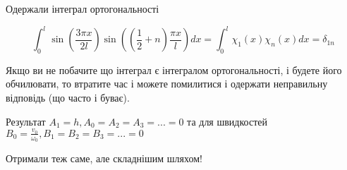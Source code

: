 \documentclass[a4paper, 14pt]{extreport}
\begin{document}
Одержали інтеграл ортогональності 

\begin{equation}
    \int^{l}_0 \sin \left( \frac{3 \pi x}{2 l} \right) \sin \left( (\frac{1}{2} + n) \frac{\pi x}{l} \right) dx = \int^{l}_0 \chi_1 (x) \chi_n (x) dx = \delta_{1n}
\end{equation}

Якщо ви не побачите що інтеграл є інтегралом ортогональності, і будете його обчилювати, то втратите час і можете помилитися і одержати неправильну відповідь (що часто і буває).

Результат $A_1 = h, A_0 = A_2 = A_3 = ... = 0$ та для швидкостей $B_0 = \frac{v_0}{\omega_0}, B_1 = B_2 = B_3 = ... = 0$

Отримали теж саме, але складнішим шляхом!
\end{document}
